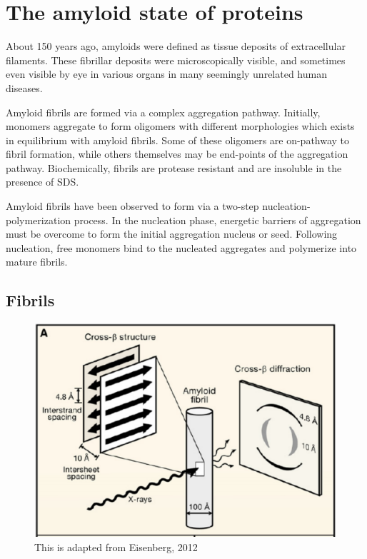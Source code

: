 
\section{The amyloid state of proteins}

About 150 years ago, amyloids were defined as tissue deposits of extracellular filaments.\cite{Haass:2007db,Sipe:2000fs} These fibrillar deposits were microscopically visible, and sometimes even visible by eye in various organs in many seemingly unrelated human diseases.

Amyloid fibrils are formed via a complex aggregation pathway. Initially, monomers aggregate to form oligomers with different morphologies which exists in equilibrium with amyloid fibrils. Some of these oligomers are on-pathway to fibril formation, while others themselves may be end-points of the aggregation pathway. Biochemically, fibrils are protease resistant and are insoluble in the presence of SDS.

Amyloid fibrils have been observed to form via a two-step nucleation-polymerization process. In the nucleation phase, energetic barriers of aggregation must be overcome to form the initial aggregation nucleus or seed.  Following nucleation, free monomers bind to the nucleated aggregates and polymerize into mature fibrils.\cite{Murphy:2002fe}


\subsection{Fibrils}

\begin{figure}
  \centering
  \includegraphics[width=6in]{figures/introduction/fibril_structure_diffraction.pdf}
  \caption[Characteristic cross-$\beta$ spacings from X-ray fibre diffraction studies of amyloid fibrils]{This is adapted from Eisenberg, 2012}
  \label{fig:fibril_diffraction}
\end{figure}

